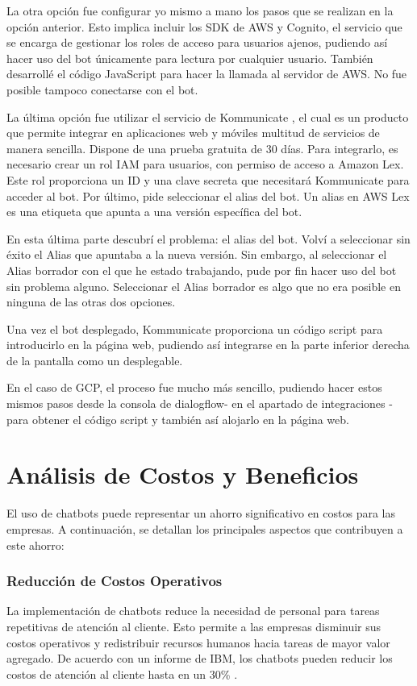 La otra opción fue configurar yo mismo a mano los pasos que se realizan en la opción anterior. Esto implica incluir los SDK de AWS y Cognito, el servicio que se encarga de gestionar los roles de acceso para usuarios ajenos, pudiendo así hacer uso del bot únicamente para lectura por cualquier usuario. También desarrollé el código JavaScript para hacer la llamada al servidor de AWS. No fue posible tampoco conectarse con el bot.

La última opción fue utilizar el servicio de Kommunicate \cite{kommunicate}, el cual es un producto que permite integrar en aplicaciones web y móviles multitud de servicios de manera sencilla. Dispone de una prueba gratuita de 30 días. Para integrarlo, es necesario crear un rol IAM para usuarios, con permiso de acceso a Amazon Lex. Este rol proporciona un ID y una clave secreta que necesitará Kommunicate para acceder al bot. Por último, pide seleccionar el alias del bot. Un alias en AWS Lex es una etiqueta que apunta a una versión específica del bot.

En esta última parte descubrí el problema: el alias del bot. Volví a seleccionar sin éxito el Alias que apuntaba a la nueva versión. Sin embargo, al seleccionar el Alias borrador con el que he estado trabajando, pude por fin hacer uso del bot sin problema alguno. Seleccionar el Alias borrador es algo que no era posible en ninguna de las otras dos opciones.

Una vez el bot desplegado, Kommunicate proporciona un código script para introducirlo en la página web, pudiendo así integrarse en la parte inferior derecha de la pantalla como un desplegable\cite{cumulusvideo}.

En el caso de GCP, el proceso fue mucho más sencillo, pudiendo hacer estos mismos pasos desde la consola de dialogflow- en el apartado de integraciones -para obtener el código script y también así alojarlo en la página web.

\section{Análisis de Costos y Beneficios}
El uso de chatbots puede representar un ahorro significativo en costos para las empresas. A continuación, se detallan los principales aspectos que contribuyen a este ahorro:

\subsubsection{Reducción de Costos Operativos}
La implementación de chatbots reduce la necesidad de personal para tareas repetitivas de atención al cliente. Esto permite a las empresas disminuir sus costos operativos y redistribuir recursos humanos hacia tareas de mayor valor agregado. De acuerdo con un informe de IBM, los chatbots pueden reducir los costos de atención al cliente hasta en un 30\% \cite{ibm2020chatbots}.

